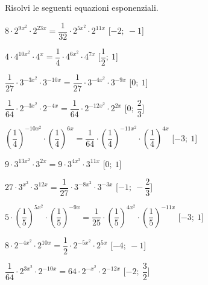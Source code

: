\begin{esercizio}\label{ese:}
 Risolvi le seguenti equazioni esponenziali.
 \begin{enumeratea}
  \item  \(8 \cdot 2^{{9x^2}} \cdot 2^{{23x}} = \dfrac{1}{32} \cdot 
2^{{5x^2}} \cdot 2^{{11x}}\)
   \hfill [\(-2;~-1\)]
  \item  \(4 \cdot 4^{{10x^2}} \cdot 4^{{x}} = \dfrac{1}{4} \cdot 
4^{{6x^2}} \cdot 4^{{7x}}\)
   \hfill [\(\dfrac{1}{2};~1\)]
  \item  \(\dfrac{1}{27} \cdot 3^{{-3x^2}} \cdot 3^{{-10x}} = \dfrac{1}{27} 
\cdot 3^{{-4x^2}} \cdot 3^{{-9x}}\)
   \hfill [\(0;~1\)]
  \item  \(\dfrac{1}{64} \cdot 2^{{-3x^2}} \cdot 2^{{-4x}} = \dfrac{1}{64} 
\cdot 2^{{-12x^2}} \cdot 2^{{2x}}\)
   \hfill [\(0;~\dfrac{2}{3}\)]
  \item  \(\left(\dfrac{1}{4}\right)^{{-10x^2}} \cdot 
\left(\dfrac{1}{4}\right)^{{6x}} = \dfrac{1}{64} \cdot 
\left(\dfrac{1}{4}\right)^{{-11x^2}} \cdot 
\left(\dfrac{1}{4}\right)^{{4x}}\)
   \hfill [\(-3;~1\)]
  \item  \(9 \cdot 3^{{13x^2}} \cdot 3^{{2x}} = 9 \cdot 3^{{4x^2}} \cdot 
3^{{11x}}\)
   \hfill [\(0;~1\)]
  \item  \(27 \cdot 3^{{x^2}} \cdot 3^{{12x}} = \dfrac{1}{27} \cdot 
3^{{-8x^2}} \cdot 3^{{-3x}}\)
   \hfill [\(-1;~-\dfrac{2}{3}\)]
  \item  \(5 \cdot \left(\dfrac{1}{5}\right)^{{5x^2}} \cdot 
\left(\dfrac{1}{5}\right)^{{-9x}} = \dfrac{1}{25} \cdot 
\left(\dfrac{1}{5}\right)^{{4x^2}} \cdot 
\left(\dfrac{1}{5}\right)^{{-11x}}\)
   \hfill [\(-3;~1\)]
  \item  \(8 \cdot 2^{{-4x^2}} \cdot 2^{{10x}} = \dfrac{1}{2} \cdot 
2^{{-5x^2}} \cdot 2^{{5x}}\)
   \hfill [\(-4;~-1\)]
  \item  \(\dfrac{1}{64} \cdot 2^{{3x^2}} \cdot 2^{{-10x}} = 64 \cdot 
2^{{-x^2}} \cdot 2^{{-12x}}\)
   \hfill [\(-2;~\dfrac{3}{2}\)]

\end{enumeratea}
\end{esercizio}
